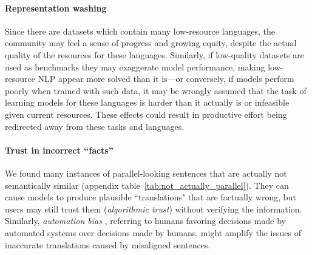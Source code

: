 \paragraph{Representation washing}
Since there are datasets which contain many low-resource languages, the community may feel a sense of progress and growing equity, despite the actual quality of the resources for these languages. %
Similarly, if low-quality datasets are used as benchmarks they may exaggerate model performance, making low-resource NLP appear more solved than it is---or conversely, if models perform poorly when trained with such data, it may be wrongly assumed that the task of learning models for these languages is harder than it actually is or infeasible given current resources. These effects could result in productive effort being redirected away from these tasks and languages.

\paragraph{Trust in incorrect ``facts''} %
We found many instances of parallel-looking sentences that are actually not semantically similar (appendix table~\ref{tab:not_actually_parallel}). They can cause models to produce plausible ``translations" that are factually wrong, but users may still trust them (\textit{algorithmic trust}) without verifying the information. %
Similarly, \textit{automation bias} \citep{skitka1999does},
referring to humans favoring decisions made by automated systems over decisions made by humans, might amplify the issues of inaccurate translations caused by misaligned sentences.


